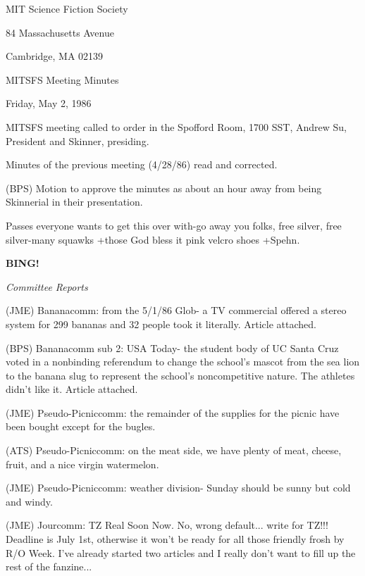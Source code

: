 \documentclass[12pt]{article}
\newcommand{\bing}{{\bf BING!} }
\newcommand{\goto}[1]{\bing \vskip 12pt \centerline{{\em{#1}}}}
\begin{document}
\begin{center}

MIT Science Fiction Society 

84 Massachusetts Avenue

Cambridge, MA 02139

\vspace{12pt}

MITSFS Meeting Minutes 

Friday, May 2, 1986

\end{center}
 
\vspace{18pt}

\setlength{\parskip}{6pt}

\noindent
MITSFS meeting called to order in the Spofford Room, 1700 SST,
Andrew Su, President and Skinner, presiding.

Minutes of the previous meeting (4/28/86) read and corrected.

(BPS) Motion to approve the minutes as about an hour away from being Skinnerial in their presentation.

Passes everyone wants to get this over with-go away you folks, free silver, free silver-many squawks +those God bless it pink velcro shoes +Spehn.

\goto{Committee Reports}

(JME) Bananacomm: from the 5/1/86 Glob- a TV commercial offered a stereo system for 299 bananas and 32 people took it literally. Article attached.

(BPS) Bananacomm sub 2: USA Today- the student body of UC Santa Cruz voted in a nonbinding referendum to change the school's mascot from the sea lion to the banana slug to represent the school's noncompetitive nature. The athletes didn't like it. Article attached.

(JME) Pseudo-Picniccomm: the remainder of the supplies for the picnic have been bought except for the bugles.

(ATS) Pseudo-Picniccomm: on the meat side, we have plenty of meat, cheese, fruit, and a nice virgin watermelon.

(JME) Pseudo-Picniccomm: weather division- Sunday should be sunny but cold and windy.

(JME) Jourcomm: TZ Real Soon Now. No, wrong default... write for TZ!!! Deadline is July 1st, otherwise it won't be ready for all those friendly frosh by R/O Week. I've already started two articles and I really don't want to fill up the rest of the fanzine...
\end{document}
